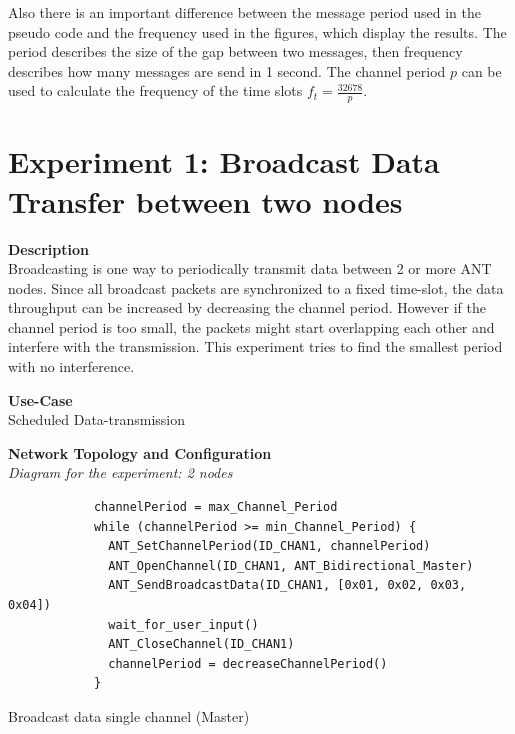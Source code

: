 Also there is an important difference between the message period used in the pseudo code and the frequency used in the figures, which display the results. The period describes the size of the gap between two messages, then frequency describes how many messages are send in 1 second. The channel period $p$ can be used to calculate the frequency of the time slots $f_t = \frac{32678}{p}$.  

\newpage


\section{Experiment 1: Broadcast Data Transfer between two nodes}
\begin{description} 
	\item{\textbf{Description}} \hfill \\ Broadcasting is one way to periodically transmit data between 2 or more ANT nodes. Since all broadcast packets are synchronized to a fixed time-slot, the data throughput can be increased by decreasing the channel period. However if the channel period is too small, the packets might start overlapping each other and interfere with the transmission. This experiment tries to find the smallest period with no interference.
	\item{\textbf{Use-Case}} \hfill \\ Scheduled Data-transmission	
	\item{\textbf{Network Topology and Configuration}} \hfill \\ \textit{Diagram for the experiment:  2 nodes} \\
		\begin{code}[h]
			\begin{verbatim}
			channelPeriod = max_Channel_Period
			while (channelPeriod >= min_Channel_Period) {
			  ANT_SetChannelPeriod(ID_CHAN1, channelPeriod)
			  ANT_OpenChannel(ID_CHAN1, ANT_Bidirectional_Master)
			  ANT_SendBroadcastData(ID_CHAN1, [0x01, 0x02, 0x03, 0x04])
			  wait_for_user_input()
			  ANT_CloseChannel(ID_CHAN1)
			  channelPeriod = decreaseChannelPeriod()
			}
			\end{verbatim}
			\caption{Broadcast data single channel (Master)}\label{lst:mExp1}
		\end{code}
		

\end{description}
